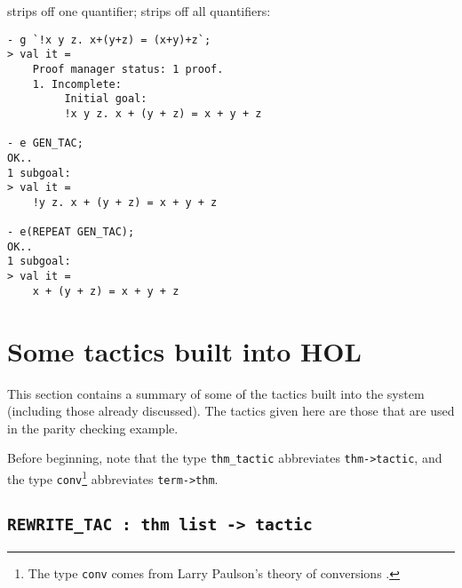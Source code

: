 \noindent {} strips off one quantifier;
 strips off all quantifiers:

\begin{session}\begin{verbatim}
- g `!x y z. x+(y+z) = (x+y)+z`;
> val it =
    Proof manager status: 1 proof.
    1. Incomplete:
         Initial goal:
         !x y z. x + (y + z) = x + y + z

- e GEN_TAC;
OK..
1 subgoal:
> val it =
    !y z. x + (y + z) = x + y + z

- e(REPEAT GEN_TAC);
OK..
1 subgoal:
> val it =
    x + (y + z) = x + y + z
\end{verbatim}\end{session}

\section{Some tactics built into HOL}

This section contains a summary of some of the tactics built into the
\HOL{} system (including those already discussed).  The tactics given
here are those that are used in the parity checking example.

Before beginning, note that the \ML{} type {\small\verb|thm_tactic|}
abbreviates {\small\verb|thm->tactic|}, and the type
{\small\verb|conv|}\footnote{The type {\small{\tt conv}} comes from
  Larry Paulson's theory of conversions \cite{lcp_rewrite}.}
abbreviates {\small\verb|term->thm|}.

\subsection{\tt REWRITE\_TAC : thm list -> tactic}
\label{rewrite}


